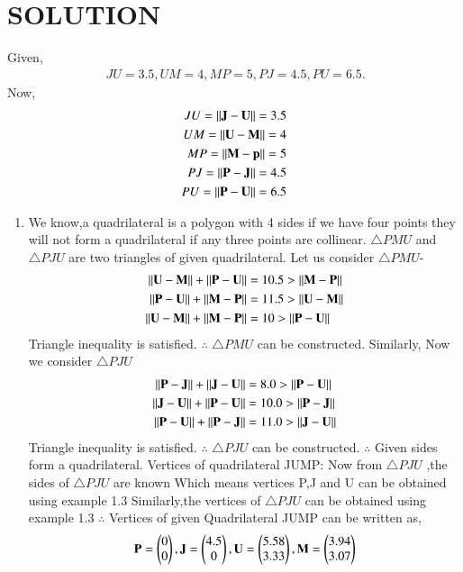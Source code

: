 \documentclass[journal,12pt,twocolumn]{IEEEtran}
\begin{document}
\section{SOLUTION}
 Given,
\begin{align}
\ JU=3.5, UM=4, MP=5, PJ=4.5, PU=6.5 .
\end{align}
Now,
\begin{align}
JU=\left\lVert\mathbf{J}-\mathbf{U}\right\rVert = 3.5
 \\
UM=\left\lVert\mathbf{U}-\mathbf{M}\right\rVert = 4
 \\
MP=\left\lVert\mathbf{M}-\mathbf{p}\right\rVert = 5
 \\
PJ=\left\lVert\mathbf{P}-\mathbf{J}\right\rVert = 4.5
 \\
PU=\left\lVert\mathbf{P}-\mathbf{U}\right\rVert = 6.5
\end{align}
\begin{enumerate}
\item We know,a quadrilateral is a polygon with 4 sides if we have four points they will not form a quadrilateral if any three points are collinear. 
$\triangle PMU$ and $\triangle PJU$ are two triangles of given quadrilateral.
Let us consider $\triangle PMU$-
\begin{align}
\left\lVert\mathbf{U}-\mathbf{M}\right\rVert+\left\lVert\mathbf{P}-\mathbf{U}\right\rVert&=10.5> \left\lVert\mathbf{M}-\mathbf{P}\right\rVert\\
\left\lVert\mathbf{P}-\mathbf{U}\right\rVert+\left\lVert\mathbf{M}-\mathbf{P}\right\rVert&=11.5>\left\lVert\mathbf{U}-\mathbf{M}\right\rVert\\
\left\lVert\mathbf{U}-\mathbf{M}\right\rVert+\left\lVert\mathbf{M}-\mathbf{P}\right\rVert&=10>\left\lVert\mathbf{P}-\mathbf{U}\right\rVert
\end{align}
Triangle inequality is satisfied.
$\therefore$ $\triangle PMU$ can be constructed.
Similarly, Now we consider $\triangle PJU$
\begin{align}
\left\lVert\mathbf{P}-\mathbf{J}\right\rVert + \left\lVert\mathbf{J}-\mathbf{U}\right\rVert&=8.0 > \left\lVert\mathbf{P}-\mathbf{U}\right\rVert
\\
\left\lVert\mathbf{J}-\mathbf{U}\right\rVert + \left\lVert\mathbf{P}-\mathbf{U}\right\rVert&=10.0 > \left\lVert\mathbf{P}-\mathbf{J}\right\rVert
\\
\left\lVert\mathbf{P}-\mathbf{U}\right\rVert + \left\lVert\mathbf{P}-\mathbf{J}\right\rVert&=11.0 > \left\lVert\mathbf{J}-\mathbf{U}\right\rVert
\end{align}
Triangle inequality is satisfied.
$\therefore$ $\triangle PJU$ can be constructed.
$\therefore$ Given sides form a quadrilateral.
Vertices of quadrilateral JUMP:
Now from $\triangle PJU$ ,the sides of $\triangle PJU$ are known Which means vertices P,J and U can be obtained using example 1.3
Similarly,the vertices of $\triangle PJU$ can be obtained using example 1.3
$\therefore$ Vertices of given Quadrilateral JUMP can be written as,
\begin{align}
\vec{P}=\myvec{0\\0},\vec{J} = \myvec{4.5\\0}, \vec{U}=\myvec{5.58\\3.33},\vec{M}=\myvec{3.94\\3.07}

\end{align}
\end{enumerate}
\end{document}
